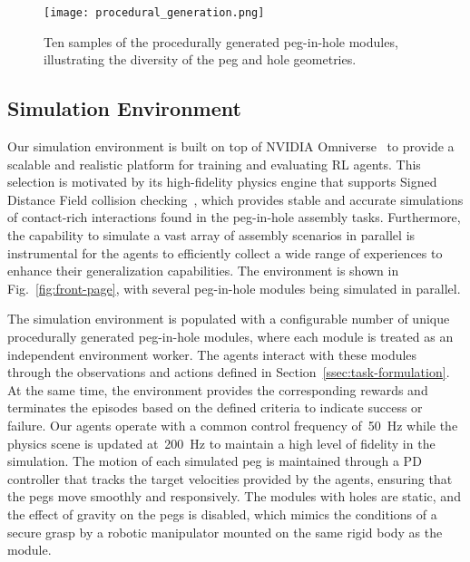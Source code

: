 \begin{figure}[ht]
    \vspace{-1.0\baselineskip}
    \centering
    \texttt{[image: procedural\_generation.png]}
    \caption{Ten samples of the procedurally generated peg-in-hole modules, illustrating the diversity of the peg and hole geometries.}
    \label{fig:procedural-generation}
\end{figure}


\subsection{Simulation Environment}\label{ssec:simulation-environment}

Our simulation environment is built on top of NVIDIA Omniverse~\cite{omniverse} to provide a scalable and realistic platform for training and evaluating RL agents. This selection is motivated by its high-fidelity physics engine that supports Signed Distance Field collision checking~\cite{macklin2020local}, which provides stable and accurate simulations of contact-rich interactions found in the peg-in-hole assembly tasks. Furthermore, the capability to simulate a vast array of assembly scenarios in parallel is instrumental for the agents to efficiently collect a wide range of experiences to enhance their generalization capabilities. The environment is shown in Fig.~\ref{fig:front-page}, with several peg-in-hole modules being simulated in parallel.

The simulation environment is populated with a configurable number of unique procedurally generated peg-in-hole modules, where each module is treated as an independent environment worker. The agents interact with these modules through the observations and actions defined in Section~\mbox{\ref{ssec:task-formulation}}. At the same time, the environment provides the corresponding rewards and terminates the episodes based on the defined criteria to indicate success or failure. Our agents operate with a common control frequency of~50~Hz while the physics scene is updated at~200~Hz to maintain a high level of fidelity in the simulation. The motion of each simulated peg is maintained through a PD controller that tracks the target velocities provided by the agents, ensuring that the pegs move smoothly and responsively. The modules with holes are static, and the effect of gravity on the pegs is disabled, which mimics the conditions of a secure grasp by a robotic manipulator mounted on the same rigid body as the module.

